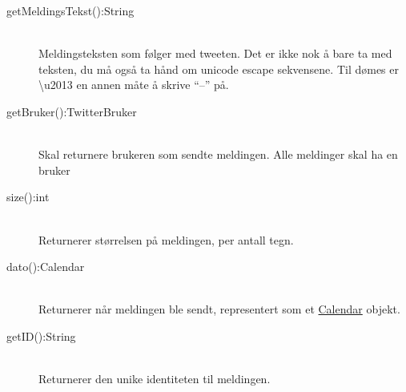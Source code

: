 \documentclass{article}
\begin{document}
\begin{description}
\item [getMeldingsTekst():String] \ \\ %
  Meldingsteksten som følger med tweeten.
  Det er ikke nok å bare ta med teksten, du må også ta hånd om unicode escape sekvensene. Til dømes er \textbackslash u2013 en annen måte å skrive ``–'' på.
\item [getBruker():TwitterBruker] \ \\
  Skal returnere brukeren som sendte meldingen.
  Alle meldinger skal ha en bruker
\item [size():int] \ \\
  Returnerer størrelsen på meldingen, per antall tegn.
\item [dato():Calendar] \ \\
  Returnerer når meldingen ble sendt, representert som et \href{http://docs.oracle.com/javase/7/docs/api/java/util/Calendar.html}{Calendar} objekt.
\item [getID():String] \ \\
  Returnerer den unike identiteten til meldingen.
\end{description}
\newpage
\end{document}
